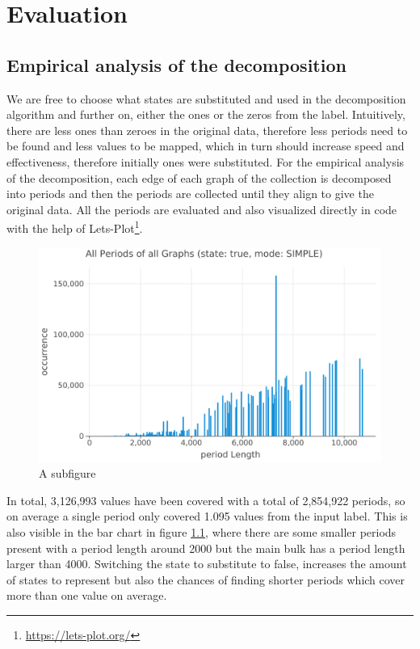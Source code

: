 
\chapter{Evaluation}
\label{ch:Evaluation}
\section{Empirical analysis of the decomposition}

We are free to choose what states are substituted and used in the decomposition algorithm and further on, either the ones or the zeros from the label. Intuitively, there are less ones than zeroes in the original data, therefore less periods need to be found and less values to be mapped, which in turn should increase speed and effectiveness, therefore initially ones were substituted. For the empirical analysis of the decomposition, each edge of each graph of the collection is decomposed into periods and then the periods are collected until they align to give the original data. All the periods are evaluated and also visualized directly in code with the help of Lets-Plot\footnote{\url{https://lets-plot.org/}}.

\begin{figure}[h]
	\includegraphics[width=\linewidth]{charts/all-graphs-bar-char-strue-mSIMPLE.png}
	\caption{A subfigure}
	\label{fig:plot-all-periods-true-state}
\end{figure}

In total, 3,126,993 values have been covered with a total of 2,854,922 periods, so on average a single period only covered 1.095 values from the input label. This is also visible in the bar chart in figure \ref{fig:plot-all-periods-true-state}, where there are some smaller periods present with a period length around 2000 but the main bulk has a period length larger than 4000. Switching the state to substitute to false, increases the amount of states to represent but also the chances of finding shorter periods which cover more than one value on average.

